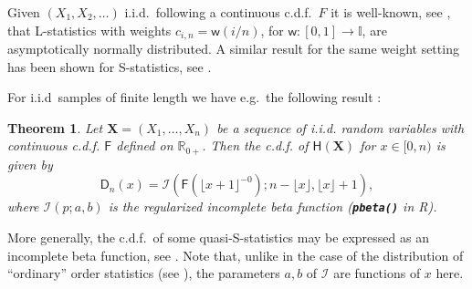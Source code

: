\documentclass[11pt]{article}\usepackage[]{graphicx}\usepackage[]{color}
\newcommand{\hlkwd}[1]{\textcolor[rgb]{0.737,0.353,0.396}{\textbf{#1}}}%
\newcommand{\lang}[1]{\textsf{#1}\xspace}
\newcommand{\R}{\lang{R}}
\newcommand{\Rfunc}[1]{\texttt{\hlkwd{#1}}}
\newcommand{\vect}[1]{{\mathbf{#1}}}
\newcommand{\func}[1]{{\mathsf{#1}}}
\newcommand{\Ival}{\mathbb{I}}
\newtheorem{theorem}{Theorem}%
\theoremstyle{remark}
\theoremstyle{definition}
\begin{document}
Given $(X_1,X_2,\dots)$ i.i.d.~following a continuous c.d.f.~$F$
it is well-known, see \cite{DavidNagaraja2003:orderstatistics},
that L-statistics with weights $c_{i,n}=\func{w}(i/n)$, for $\func{w}:[0,1]\to\Ival$,
are asymptotically normally distributed.
A similar result for the same weight setting
has been shown for S-statistics, see \cite{GagolewskiGrzegorzewski2010:smps}.


For i.i.d~samples of finite length we have e.g.~the following
result \cite{Gagolewski2012:smps}:

\begin{theorem}
Let $\vect{X}=(X_{1},\dots,X_{n})$ be a sequence of i.i.d.
random variables with continuous c.d.f. $\func{F}$ defined on $\mathbb{R}_{0+}$.
Then the c.d.f. of $\func{H}(\vect{X})$ for $x\in[0,n)$ is given by
\[
\func{D}_{n}(x)=\mathcal{I}(\func{F}(\lfloor x+1\rfloor^{-0});n-\lfloor x\rfloor,
\lfloor x \rfloor+1),
\]
where $\mathcal{I}(p;a,b)$ is the regularized incomplete beta function
(\Rfunc{pbeta()} in \R).
\end{theorem}

More generally, the c.d.f.~of some quasi-S-statistics
may be expressed as an incomplete beta function,
see \cite{GagolewskiGrzegorzewski2010:smps}.
Note that, unlike in the case of
the distribution of ``ordinary'' order statistics
(see \cite{DavidNagaraja2003:orderstatistics}),
the parameters $a,b$ of $\mathcal{I}$ are functions of $x$ here.
\end{document}
